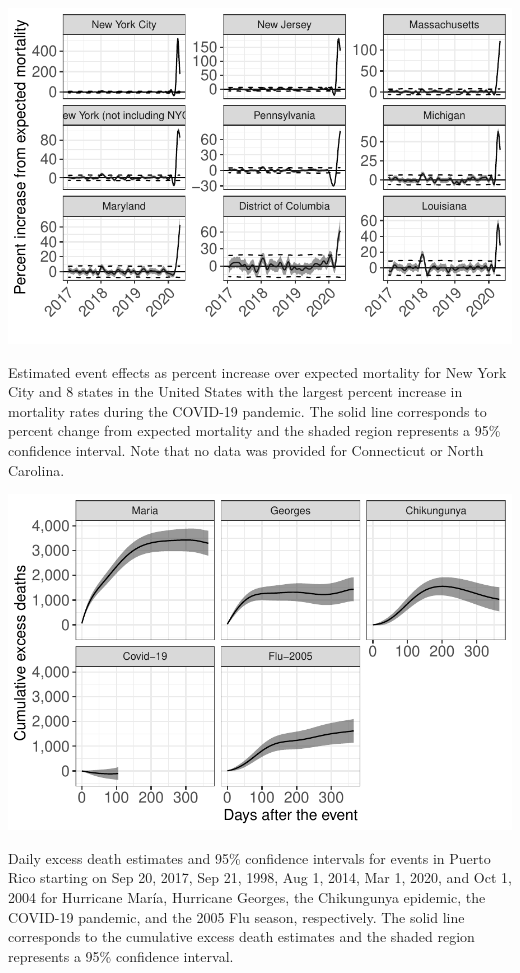 \documentclass[11pt]{article}
\begin{document}
\begin{suppfigure}[ht]
	\centering
	\includegraphics[width=1\linewidth]{figs/supp-figure-4.pdf} 
	\caption{Estimated event effects as percent increase over expected mortality for New York City and 8 states in the United States with the largest percent increase in mortality rates during the COVID-19 pandemic. The solid line corresponds to percent change from expected mortality and the shaded region represents a 95\% confidence interval. Note that no data was provided for Connecticut or North Carolina.}
	\label{supp-fig:covid19-states}
\end{suppfigure}

\begin{suppfigure}[ht]
	\centering
	\includegraphics[width=1\linewidth]{figs/supp-figure-5.pdf} 
	\caption{Daily excess death estimates and 95\% confidence intervals for events in Puerto Rico starting on Sep 20, 2017, Sep 21, 1998, Aug 1, 2014, Mar 1, 2020, and Oct 1, 2004 for Hurricane Mar\'ia, Hurricane Georges, the Chikungunya epidemic, the COVID-19 pandemic, and the 2005 Flu season, respectively. The solid line corresponds to the cumulative excess death estimates and the shaded region represents a 95\% confidence interval.}
	\label{supp-fig:excess-deaths}
\end{suppfigure}
\end{document}
